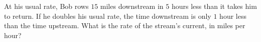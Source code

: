 At his usual rate, Bob rows $15$ miles downstream in $5$ hours less than it takes him to return. If he doubles his usual rate, the time downstream is only $1$ hour less than the time upstream. What is the rate of the stream's current, in miles per hour?
